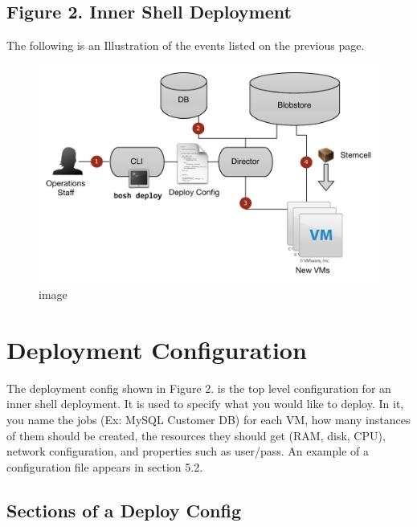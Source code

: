 \section{Figure 2. Inner Shell Deployment}
\label{figure2.innershelldeployment}

The following is an Illustration of the events listed on the previous page. 

\begin{figure}[htbp]
\centering
\includegraphics[keepaspectratio,width=\textwidth,height=0.75\textheight]{fig2.pdf}
\caption{image}
\label{}
\end{figure}



\chapter{Deployment Configuration}
\label{deploymentconfiguration}

The deployment config shown in Figure 2. is the top level configuration for an inner shell deployment. It is used to specify what you would like to deploy. In it, you name the jobs (Ex: MySQL Customer DB) for each VM, how many instances of them should be created, the resources they should get (RAM, disk, CPU), network configuration, and properties such as user\slash pass. An example of a configuration file appears in section 5.2.

\section{Sections of a Deploy Config}
\label{sectionsofadeployconfig}

